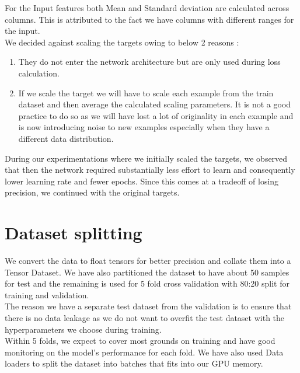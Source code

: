 \documentclass{report} %
\begin{document}
\vspace{0.2cm} %

For the Input features both Mean and Standard deviation are calculated across columns. This is attributed to the fact we have columns with different ranges for the input.\\ 

We decided against scaling the targets owing to below 2 reasons :
\begin{enumerate}
    \item They do not enter the network architecture but are only used during loss calculation.
    \item If we scale the target we will have to scale each example from the train dataset and then average the calculated scaling parameters.
    It is not a good practice to do so as we will have lost a lot of originality in each example and is now introducing noise to new examples especially when they have a different data distribution.\\
\end{enumerate}

During our experimentations where we initially scaled the targets, we observed that then the network required substantially less effort to learn and consequently lower learning rate and fewer epochs.
Since this comes at a tradeoff of losing precision, we continued with the original targets.\\

\section{Dataset splitting}\label{sec:Dataset splitting}

We convert the data to float tensors for better precision and collate them into a Tensor Dataset.
We have also partitioned the dataset to have about 50 samples for test and the remaining is used for 5 fold cross validation with 80:20 split for training and validation. \\
The reason we have a separate test dataset from the validation is to ensure that there is no data leakage as we do not want to overfit the test dataset with the hyperparameters we choose during training. \\

Within 5 folds, we expect to cover most grounds on training and have good monitoring on the model's performance for each fold.
We have also used Data loaders to split the dataset into batches that fits into our \ac{GPU} memory.
\end{document}
